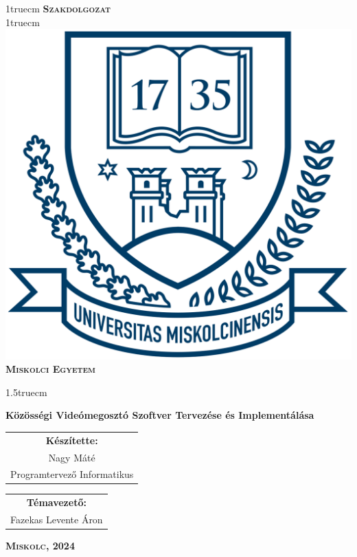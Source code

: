 \pagestyle{empty} %

{\large
    \begin{center}
        \vglue 1truecm
        \textbf{\huge\textsc{Szakdolgozat}}\\
        \vglue 1truecm
        \includegraphics[width=4.8truecm, height=4truecm]{images/me_logo.png}\\
        \textbf{\textsc{Miskolci Egyetem}}
    \end{center}}

\vglue 1.5truecm %

    {\LARGE
        \begin{center}
            \textbf{Közösségi Videómegosztó Szoftver Tervezése és Implementálása}
        \end{center}}

\vspace*{2.5truecm}
{\large
    \begin{center}
        \begin{tabular}{c}
            \textbf{Készítette:} \\
            Nagy Máté            \\
            Programtervez\H o Informatikus
        \end{tabular}
    \end{center}
    \begin{center}
        \begin{tabular}{c}
            \textbf{Témavezető:} \\
            Fazekas Levente \'Aron
        \end{tabular}
    \end{center}}
\vfill
{\large
    \begin{center}
        \textbf{\textsc{Miskolc, 2024}}
    \end{center}}

\newpage